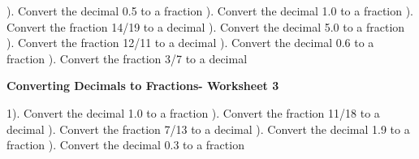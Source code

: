 \documentclass{article}%
\begin{document}
). Convert the decimal 0.5 to a fraction%
\newline%
\newline%
). Convert the decimal 1.0 to a fraction%
\newline%
\newline%
). Convert the fraction 14/19 to a decimal%
\newline%
\newline%
). Convert the decimal 5.0 to a fraction%
\newline%
\newline%
). Convert the fraction 12/11 to a decimal%
\newline%
\newline%
). Convert the decimal 0.6 to a fraction%
\newline%
\newline%
). Convert the fraction 3/7 to a decimal%
\newline%
\newline%
\newline%
\pagebreak%
\large%
\begin{center}%
\textbf{Converting Decimals to Fractions- Worksheet 3}%
\newline%
\end{center} \normalsize%
1). Convert the decimal 1.0 to a fraction%
\newline%
\newline%
). Convert the fraction 11/18 to a decimal%
\newline%
\newline%
). Convert the fraction 7/13 to a decimal%
\newline%
\newline%
). Convert the decimal 1.9 to a fraction%
\newline%
\newline%
). Convert the decimal 0.3 to a fraction%
\newline%
\newline%
\newline%
\end{document}

